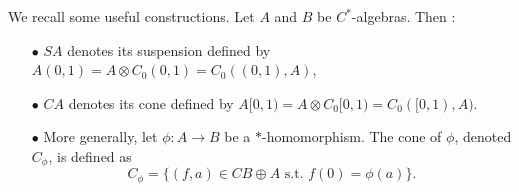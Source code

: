 
We recall some useful constructions. Let $A$ and $B$ be $C^*$-algebras. Then : 

\begin{itemize}
\item[$\bullet$] $SA$ denotes its suspension defined by $A(0,1) = A\otimes C_0(0,1) = C_0((0,1),A)$,
\item[$\bullet$] $CA$ denotes its cone defined by $A[0,1) = A\otimes C_0[0,1) = C_0([0,1),A)$.
\item[$\bullet$] More generally, let $\phi : A \rightarrow B$ be a $*$-homomorphism. The cone of $\phi$, denoted $C_\phi$, is defined as 
\[C_\phi = \{(f,a)\in CB\oplus A \text{ s.t. } f(0) = \phi(a)\}.\] 
\end{itemize}
